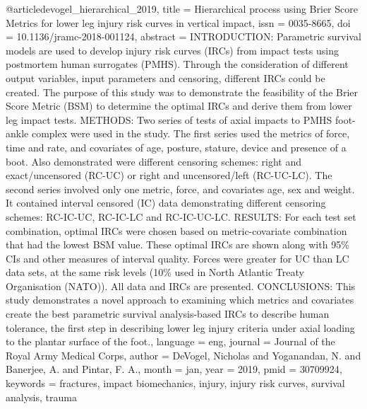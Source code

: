 @article{devogel_hierarchical_2019,
	title = {Hierarchical process using {Brier} {Score} {Metrics} for lower leg injury risk curves in vertical impact},
	issn = {0035-8665},
	doi = {10.1136/jramc-2018-001124},
	abstract = {INTRODUCTION: Parametric survival models are used to develop injury risk curves (IRCs) from impact tests using postmortem human surrogates (PMHS). Through the consideration of different output variables, input parameters and censoring, different IRCs could be created. The purpose of this study was to demonstrate the feasibility of the Brier Score Metric (BSM) to determine the optimal IRCs and derive them from lower leg impact tests.
METHODS: Two series of tests of axial impacts to PMHS foot-ankle complex were used in the study. The first series used the metrics of force, time and rate, and covariates of age, posture, stature, device and presence of a boot. Also demonstrated were different censoring schemes: right and exact/uncensored (RC-UC) or right and uncensored/left (RC-UC-LC). The second series involved only one metric, force, and covariates age, sex and weight. It contained interval censored (IC) data demonstrating different censoring schemes: RC-IC-UC, RC-IC-LC and RC-IC-UC-LC.
RESULTS: For each test set combination, optimal IRCs were chosen based on metric-covariate combination that had the lowest BSM value. These optimal IRCs are shown along with 95\% CIs and other measures of interval quality. Forces were greater for UC than LC data sets, at the same risk levels (10\% used in North Atlantic Treaty Organisation (NATO)). All data and IRCs are presented.
CONCLUSIONS: This study demonstrates a novel approach to examining which metrics and covariates create the best parametric survival analysis-based IRCs to describe human tolerance, the first step in describing lower leg injury criteria under axial loading to the plantar surface of the foot.},
	language = {eng},
	journal = {Journal of the Royal Army Medical Corps},
	author = {DeVogel, Nicholas and Yoganandan, N. and Banerjee, A. and Pintar, F. A.},
	month = jan,
	year = {2019},
	pmid = {30709924},
	keywords = {fractures, impact biomechanics, injury, injury risk curves, survival analysis, trauma}
}